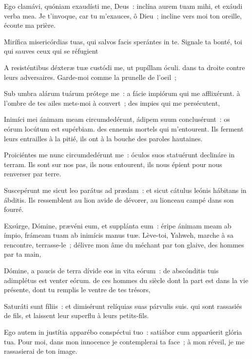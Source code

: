 \begin{paracol}{2}

\LigneParacol{0cm}
{Ego clamávi, quóniam exaudísti me, Deus~: \GreStar{} inclína aurem tuam mihi, et exáudi verba mea.}
{Je t'invoque, car tu m'exauces, ô Dieu~; incline vers moi ton oreille, écoute ma prière. }

\LigneParacol{0.2cm}
{Mirífica misericórdias tuas, \GreStar{} qui salvos facis sperántes in te.}
{Signale ta bonté, toi qui sauves ceux qui se réfugient}

\LigneParacol{0.2cm}
{A resisténtibus déxteræ tuæ custódi me, \GreStar{} ut pupíllam óculi.}
{dans ta droite contre leurs adversaires. Garde-moi comme la prunelle de l'oeil~;}

\LigneParacol{0.2cm}
{Sub umbra alárum tuárum prótege me~: \GreStar{} a fácie impiórum qui me afflixérunt.}
{à l'ombre de tes ailes mets-moi à couvert~; des impies qui me persécutent,}

\LigneParacol{0.2cm}
{Inimíci mei ánimam meam circumdedérunt, ádipem suum conclusérunt~: \GreStar{} os eórum locútum est supérbiam.}
{des ennemis mortels qui m'entourent. Ils ferment leurs entrailles à la pitié, ils ont à la bouche des paroles hautaines. }

\LigneParacol{0.2cm}
{Proiciéntes me nunc circumdedérunt me~: \GreStar{} óculos suos statuérunt declináre in terram.}
{Ils sont sur nos pas, ils nous entourent, ils nous épient pour nous renverser par terre. }

\LigneParacol{0.2cm}
{Suscepérunt me sicut leo parátus ad prædam~: \GreStar{} et sicut cátulus leónis hábitans in ábditis.}
{Ils ressemblent au lion avide de dévorer, au lionceau campé dans son fourré. }

\end{paracol}
\Gloria
\begin{paracol}{2}

\LigneParacol{0cm}
{Exsúrge, Dómine, prævéni eum, et supplánta eum~: \GreStar{} éripe ánimam meam ab ímpio, frámeam tuam ab inimícis manus tuæ.}
{Lève-toi, Yahweh, marche à sa rencontre, terrasse-le~; délivre mon âme du méchant par ton glaive, des hommes par ta main,}

\LigneParacol{0.2cm}
{Dómine, a paucis de terra dívide eos in vita eórum~: \GreStar{} de abscónditis tuis adimplétus est venter eórum.}
{de ces hommes du siècle dont la part est dans la vie présente, dont tu remplis le ventre de tes trésors,}

\LigneParacol{0.2cm}
{Saturáti sunt fíliis~: \GreStar{} et dimisérunt relíquias suas párvulis suis.}
{qui sont rassasiés de fils, et laissent leur superflu à leurs petits-fils. }

\LigneParacol{0.2cm}
{Ego autem in justítia apparébo conspéctui tuo~: \GreStar{} satiábor cum apparúerit glória tua.}
{Pour moi, dans mon innocence je contemplerai ta face~; à mon réveil, je me rassasierai de ton image. }

\end{paracol}
